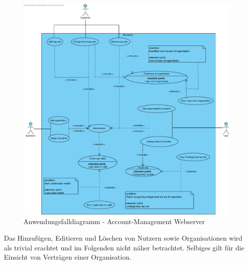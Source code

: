 \begin{figure}[h]
    \centering
    \includegraphics[width=\linewidth]{img/diagrams/Acc_Management_Web.pdf}
    \caption{Anwendungsfalldiagramm - Account-Management Webserver}
    \label{fig:anwendungsfalldiagramm-acc}
\end{figure}

Das Hinzufügen, Editieren und Löschen von Nutzern sowie Organisationen wird als trivial erachtet und im Folgenden nicht näher betrachtet. Selbiges gilt für die Einsicht von Verträgen einer Organisation.

